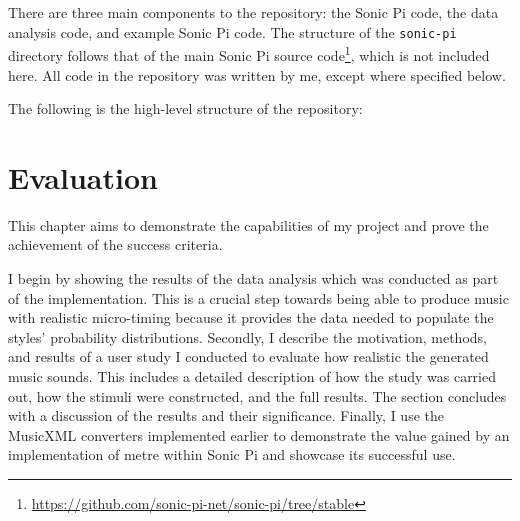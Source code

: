\documentclass[12pt,twoside,openright]{report}
\begin{document}
There are three main components to the repository: the Sonic Pi code, the data analysis code, and example Sonic Pi code. The structure of the \verb'sonic-pi' directory follows that of the main Sonic Pi source code\footnote{\url{https://github.com/sonic-pi-net/sonic-pi/tree/stable}}, which is not included here. All code in the repository was written by me, except where specified below.

The following is the high-level structure of the repository:
\vspace{2mm}





\chapter{Evaluation} \label{evaluation}

This chapter aims to demonstrate the capabilities of my project and prove the
achievement of the success criteria.

I begin by showing the results of the
data analysis which was conducted as part of the implementation. This is a
crucial step towards being able to produce music with realistic micro-timing
because it provides the data needed to populate the styles' probability
distributions. Secondly, I describe the motivation, methods, and results of
a user study I conducted to evaluate how realistic the generated music sounds.
This includes a detailed description of how the study was carried out, how the
stimuli were constructed, and the full results. The section concludes with a
discussion of the results and their significance. Finally, I use the MusicXML
converters implemented earlier to demonstrate the value gained by an
implementation of metre within Sonic Pi and showcase its successful use.
\end{document}
